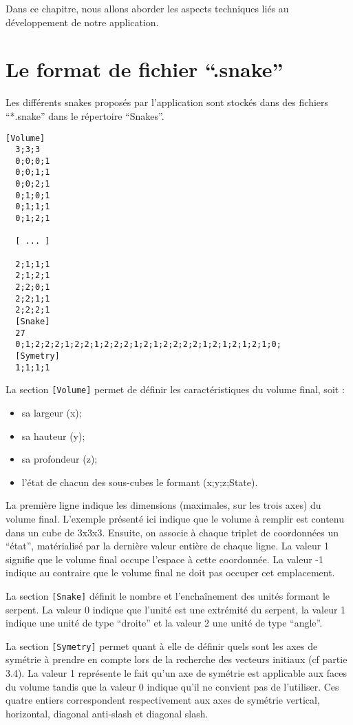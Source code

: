 Dans ce chapitre, nous allons aborder les aspects techniques liés au développement de notre application.

\section{Le format de fichier ``.snake''}
Les différents snakes proposés par l'application sont stockés dans des fichiers ``*.snake'' dans le répertoire ``Snakes''.

\begin{lstlisting}[caption=Contenu du fichier snake.snake]
 [Volume]
  3;3;3
  0;0;0;1
  0;0;1;1
  0;0;2;1
  0;1;0;1
  0;1;1;1
  0;1;2;1
 
  [ ... ]
 
  2;1;1;1
  2;1;2;1
  2;2;0;1
  2;2;1;1
  2;2;2;1
  [Snake]
  27
  0;1;2;2;2;1;2;2;1;2;2;2;1;2;1;2;2;2;2;1;2;1;2;1;2;1;0;
  [Symetry]
  1;1;1;1
\end{lstlisting}

\newpage
La section \verb|[Volume]| permet de définir les caractéristiques du volume final, soit :
\begin{itemize}
 \item sa largeur (x);
 \item sa hauteur (y);
 \item sa profondeur (z);
 \item l'état de chacun des sous-cubes le formant (x;y;z;State).
\end{itemize}

La première ligne indique les dimensions (maximales, sur les trois axes) du volume final. L'exemple présenté ici indique que le volume à remplir est contenu dans un cube de 3x3x3. 
Ensuite, on associe à chaque triplet de coordonnées un ``état'', matérialisé par la dernière valeur entière de chaque ligne. La valeur 1 signifie que le volume final occupe l'espace à cette coordonnée. La valeur -1 indique au contraire que le volume final ne doit pas occuper cet emplacement.

La section \verb|[Snake]| définit le nombre et l’enchaînement des unités formant le serpent. La valeur 0 indique que l'unité est une extrémité du serpent, la valeur 1 indique une unité de type ``droite'' et la valeur 2 une unité de type ``angle''.

La section \verb|[Symetry]| permet quant à elle de définir quels sont les axes de symétrie à prendre en compte lors de la recherche des vecteurs initiaux (cf partie 3.4). La valeur 1 représente le fait qu'un axe de symétrie est applicable aux faces du volume tandis que la valeur 0 indique qu'il ne convient pas de l'utiliser. Ces quatre entiers correspondent respectivement aux axes de symétrie vertical, horizontal, diagonal anti-slash et diagonal slash.

